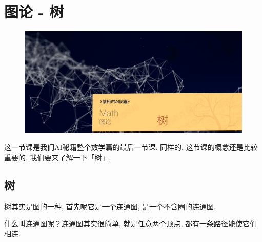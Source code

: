 \chapter{图论 - 树}

\begin{figure}[ht]
  \centering
  \includegraphics[width=1\textwidth]{asset/20230924092048.png}
\end{figure}

\newpage

这一节课是我们AI秘籍整个数学篇的最后一节课. 同样的, 这节课的概念还是比较重要的. 我们要来了解一下「树」. 

\section{树}

树其实是图的一种, 首先呢它是一个连通图, 是一个不含圈的连通图. 

什么叫连通图呢？连通图其实很简单, 就是任意两个顶点, 都有一条路径能使它们相连. 

